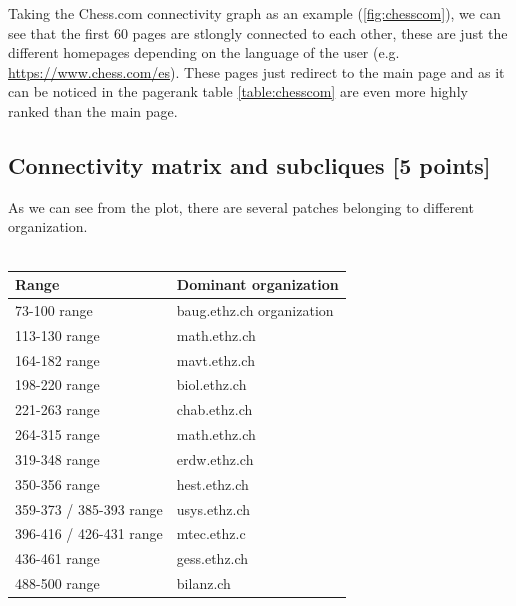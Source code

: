 \documentclass[unicode,11pt,a4paper,oneside,numbers=endperiod,openany]{scrartcl}
\begin{document}
Taking the Chess.com connectivity graph as an example (\ref{fig:chesscom}), we can see that the first 60 pages are stlongly connected to each other, 
these are just the different homepages depending on the language of the user (e.g. \url{https://www.chess.com/es}). 
These pages just redirect to the main page and as it can be noticed in the pagerank table \ref{table:chesscom} are even more highly ranked than the main page.


\subsection{Connectivity matrix and subcliques [5 points]}
As we can see from the plot, there are several patches belonging to different organization.
\\ \\
\begin{tabular}{|l|l|}
\hline
\textbf{Range} & \textbf{Dominant organization} \\
\hline
73-100 range & baug.ethz.ch organization\\
113-130 range & math.ethz.ch\\
164-182 range & mavt.ethz.ch\\
198-220 range & biol.ethz.ch\\
221-263 range & chab.ethz.ch\\
264-315 range & math.ethz.ch\\
319-348 range & erdw.ethz.ch\\
350-356 range & hest.ethz.ch\\
359-373 / 385-393 range & usys.ethz.ch\\
396-416 / 426-431 range  & mtec.ethz.c\\
436-461 range & gess.ethz.ch\\
488-500 range & bilanz.ch \\
\hline
\end{tabular}
\end{document}
